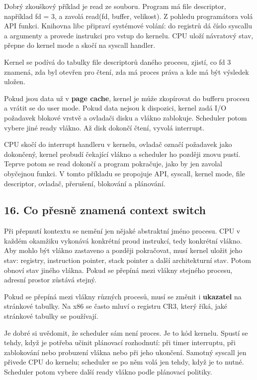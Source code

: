 Dobrý zkouškový příklad je read ze souboru. Program má file descriptor, například fd = 3, a zavolá read(fd, buffer, velikost). Z pohledu programátora volá API funkci. Knihovna libc připraví systémové volání: do registrů dá číslo syscallu a argumenty a provede instrukci pro vstup do kernelu. CPU uloží návratový stav, přepne do kernel mode a skočí na syscall handler.

Kernel se podívá do tabulky file descriptorů daného procesu, zjistí, co fd 3 znamená, zda byl otevřen pro čtení, zda má proces práva a kde má být výsledek uložen.

Pokud jsou data už v \textbf{page cache}, kernel je může zkopírovat do bufferu procesu a vrátit se do user mode. Pokud data nejsou k dispozici, kernel zadá I/O požadavek blokové vrstvě a ovladači disku a vlákno zablokuje. Scheduler potom vybere jiné ready vlákno. Až disk dokončí čtení, vyvolá interrupt.

CPU skočí do interrupt handleru v kernelu, ovladač označí požadavek jako dokončený, kernel probudí čekající vlákno a scheduler ho později znovu pustí. Teprve potom se read dokončí a program pokračuje, jako by jen zavolal obyčejnou funkci. V tomto příkladu se propojuje API, syscall, kernel mode, file descriptor, ovladač, přerušení, blokování a plánování.

\subsection*{16. Co přesně znamená context switch}

Při přepnutí kontextu se nemění jen nějaké abstraktní jméno procesu. CPU v každém okamžiku vykonává konkrétní proud instrukcí, tedy konkrétní vlákno. Aby mohlo být vlákno zastaveno a později pokračovat, musí kernel uložit jeho stav: registry, instruction pointer, stack pointer a další architekturní stav. Potom obnoví stav jiného vlákna. Pokud se přepíná mezi vlákny stejného procesu, adresní prostor zůstává stejný.

Pokud se přepíná mezi vlákny různých procesů, musí se změnit i \textbf{ukazatel} na stránkové tabulky. Na x86 se často mluví o registru CR3, který říká, jaké stránkové tabulky se používají.

Je dobré si uvědomit, že scheduler sám není proces. Je to kód kernelu. Spustí se tehdy, když je potřeba učinit plánovací rozhodnutí: při timer interruptu, při zablokování nebo probuzení vlákna nebo při jeho ukončení. Samotný syscall jen přivede CPU do kernelu; scheduler se po něm volá jen tehdy, když je to nutné. Scheduler potom vybere další ready vlákno podle plánovací politiky.

